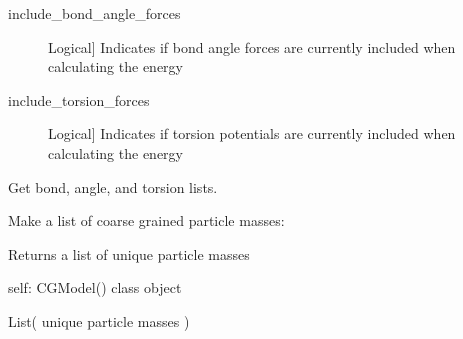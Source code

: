 \documentclass[letterpaper,12pt,english,openany,oneside]{sphinxmanual}
\begin{document}
\begin{fulllineitems}
\begin{description}
\item[{include\_bond\_angle\_forces}] \leavevmode{[}Logical{]}
Indicates if bond angle forces are currently included when calculating the energy

\item[{include\_torsion\_forces}] \leavevmode{[}Logical{]}
Indicates if torsion potentials are currently included when calculating the energy

\end{description}

\begin{fulllineitems}
\label{\detokenize{cg_model:cg_model.cgmodel.CGModel.check_energy_conservation}}
Get bond, angle, and torsion lists.

\end{fulllineitems}


\begin{fulllineitems}
\label{\detokenize{cg_model:cg_model.cgmodel.CGModel.constrain_bonds}}
Make a list of coarse grained particle masses:

\end{fulllineitems}


\begin{fulllineitems}
\label{\detokenize{cg_model:cg_model.cgmodel.CGModel.get_all_particle_masses}}
Returns a list of unique particle masses

self: CGModel() class object

List( unique particle masses )

\end{fulllineitems}



\end{fulllineitems}
\end{document}

